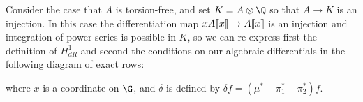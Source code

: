 \begin{example}
Consider the case that \(A\) is torsion-free, and set \(K = A \otimes \Q\) so that \(A \to K\) is an injection.  In this case the differentiation map \(x A\llbracket{x}\rrbracket \to A\llbracket{x}\rrbracket\) is an injection and integration of power series is possible in \(K\), so we can re-express first the definition of \(H^1_{dR}\) and second the conditions on our algebraic differentials in the following diagram of exact rows:
\begin{center}\vspace{-0.8\baselineskip}
\end{center}
where \(x\) is a coordinate on \(\G\), and \(\delta\) is defined by \(\delta f = (\mu^* - \pi_1^* - \pi_2^*)f\).
\end{example}


